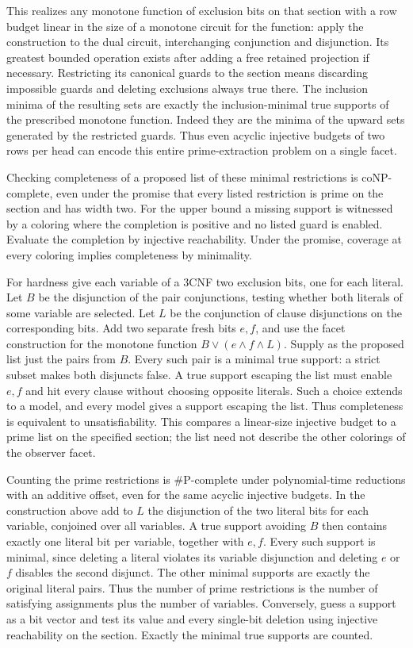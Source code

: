 This realizes any monotone function of exclusion bits
on that section with a row budget linear in the size
of a monotone circuit for the function: apply the
construction to the dual circuit, interchanging
conjunction and disjunction. Its greatest bounded
operation exists after adding a free retained projection
if necessary. Restricting its canonical guards to the
section means discarding impossible guards and deleting
exclusions always true there. The inclusion minima
of the resulting sets are exactly the inclusion-minimal
true supports of the prescribed monotone function.
Indeed they are the minima of the upward sets generated
by the restricted guards. Thus even acyclic injective
budgets of two rows per head can encode this entire
prime-extraction problem on a single facet.

Checking completeness of a proposed list of these
minimal restrictions is coNP-complete, even under
the promise that every listed restriction is prime
on the section and has width two. For the upper bound
a missing support is witnessed by a coloring where
the completion is positive and no listed guard is
enabled. Evaluate the completion by injective
reachability. Under the promise, coverage at every
coloring implies completeness by minimality.

For hardness give each variable of a $3$CNF two
exclusion bits, one for each literal. Let $B$ be the
disjunction of the pair conjunctions, testing whether
both literals of some variable are selected. Let $L$
be the conjunction of clause disjunctions on the
corresponding bits. Add two separate fresh bits
$e,f$, and use the facet construction for the
monotone function $B\lor(e\land f\land L)$.
Supply as the proposed list just the pairs from $B$.
Every such pair is a minimal true support: a strict
subset makes both disjuncts false. A true support
escaping the list must enable $e,f$ and hit every
clause without choosing opposite literals. Such
a choice extends to a model, and every model gives
a support escaping the list. Thus completeness is
equivalent to unsatisfiability. This compares a
linear-size injective budget to a prime list on the
specified section; the list need not describe the
other colorings of the observer facet.

Counting the prime restrictions is $\#\mathrm P$-complete
under polynomial-time reductions with an additive
offset, even for the same acyclic injective budgets.
In the construction above add to $L$ the disjunction
of the two literal bits for each variable, conjoined
over all variables. A true support avoiding $B$ then
contains exactly one literal bit per variable, together
with $e,f$. Every such support is minimal, since deleting
a literal violates its variable disjunction and deleting
$e$ or $f$ disables the second disjunct. The other
minimal supports are exactly the original literal
pairs. Thus the number of prime restrictions is the
number of satisfying assignments plus the number of
variables. Conversely, guess a support as a bit vector
and test its value and every single-bit deletion using
injective reachability on the section. Exactly the
minimal true supports are counted.

